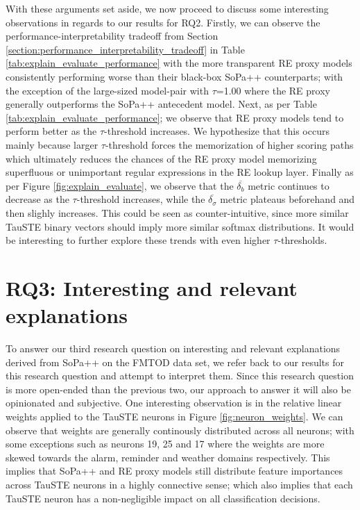 With these arguments set aside, we now proceed to discuss some interesting
observations in regards to our results for RQ2. Firstly, we can observe the
performance-interpretability tradeoff from Section
\ref{section:performance_interpretability_tradeoff} in Table
\ref{tab:explain_evaluate_performance} with the more transparent RE proxy models
consistently performing worse than their black-box SoPa++ counterparts; with the
exception of the large-sized model-pair with $\tau$=1.00 where the RE proxy
generally outperforms the SoPa++ antecedent model. Next, as per Table
\ref{tab:explain_evaluate_performance}; we observe that RE proxy models tend to
perform better as the $\tau$-threshold increases. We hypothesize that this
occurs mainly because larger $\tau$-threshold forces the memorization of higher
scoring paths which ultimately reduces the chances of the RE proxy model
memorizing superfluous or unimportant regular expressions in the RE lookup
layer. Finally as per Figure \ref{fig:explain_evaluate}, we
observe that the $\overline{\delta_{b}}$ metric continues to decrease as the
$\tau$-threshold increases, while the $\overline{\delta_{\sigma}}$ metric
plateaus beforehand and then slighly increases. This could be seen as
counter-intuitive, since more similar TauSTE binary vectors should imply more
similar softmax distributions. It would be interesting to further explore these
trends with even higher $\tau$-thresholds.

\section{RQ3: Interesting and relevant explanations}

\label{section:discussion_regex}

To answer our third research question on interesting and relevant explanations
derived from SoPa++ on the FMTOD data set, we refer back to our results for this
research question and attempt to interpret them. Since this research question is
more open-ended than the previous two, our approach to answer it will also be
opinionated and subjective. One interesting observation is in the relative
linear weights applied to the TauSTE neurons in Figure \ref{fig:neuron_weights}.
We can observe that weights are generally continously distributed across all
neurons; with some exceptions such as neurons 19, 25 and 17 where the weights
are more skewed towards the alarm, reminder and weather domains respectively.
This implies that SoPa++ and RE proxy models still distribute feature
importances across TauSTE neurons in a highly connective sense; which also implies that
each TauSTE neuron has a non-negligible impact on all classification decisions.

